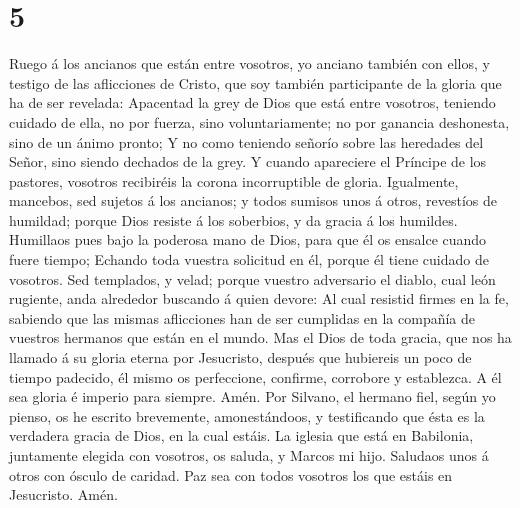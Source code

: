 \hypertarget{section-4}{%
\section{5}\label{section-4}}

 Ruego á los ancianos que están entre vosotros, yo anciano
también con ellos, y testigo de las aflicciones de Cristo, que soy
también participante de la gloria que ha de ser revelada: 
Apacentad la grey de Dios que está entre vosotros, teniendo cuidado de
ella, no por fuerza, sino voluntariamente; no por ganancia deshonesta,
sino de un ánimo pronto;  Y no como teniendo señorío sobre
las heredades del Señor, sino siendo dechados de la grey.  Y
cuando apareciere el Príncipe de los pastores, vosotros recibiréis la
corona incorruptible de gloria.  Igualmente, mancebos, sed
sujetos á los ancianos; y todos sumisos unos á otros, revestíos de
humildad; porque Dios resiste á los soberbios, y da gracia á los
humildes.  Humillaos pues bajo la poderosa mano de Dios,
para que él os ensalce cuando fuere tiempo;  Echando toda
vuestra solicitud en él, porque él tiene cuidado de vosotros.
 Sed templados, y velad; porque vuestro adversario el
diablo, cual león rugiente, anda alrededor buscando á quien devore:
 Al cual resistid firmes en la fe, sabiendo que las mismas
aflicciones han de ser cumplidas en la compañía de vuestros hermanos que
están en el mundo.  Mas el Dios de toda gracia, que nos ha
llamado á su gloria eterna por Jesucristo, después que hubiereis un poco
de tiempo padecido, él mismo os perfeccione, confirme, corrobore y
establezca.  A él sea gloria é imperio para siempre. Amén.
 Por Silvano, el hermano fiel, según yo pienso, os he
escrito brevemente, amonestándoos, y testificando que ésta es la
verdadera gracia de Dios, en la cual estáis.  La iglesia
que está en Babilonia, juntamente elegida con vosotros, os saluda, y
Marcos mi hijo.  Saludaos unos á otros con ósculo de
caridad. Paz sea con todos vosotros los que estáis en Jesucristo. Amén.
